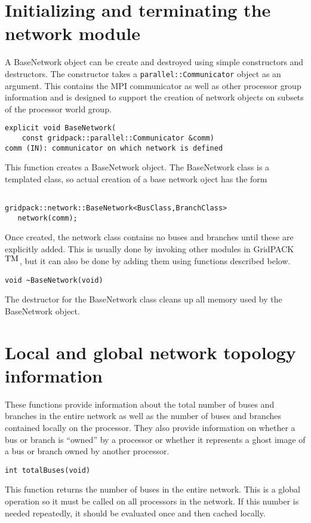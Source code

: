 \documentclass[12pt]{article}
\begin{document}
\section{Initializing and terminating the network module}
A BaseNetwork object can be create and destroyed using simple constructors and
destructors. The constructor takes a \texttt{parallel::Communicator} object as
an argument. This contains the MPI communicator as well as other processor group
information and is designed to support the creation of network objects on subsets
of the processor world group.
\color{blue}
\begin{verbatim}
explicit void BaseNetwork(
    const gridpack::parallel::Communicator &comm)
comm (IN): communicator on which network is defined
\end{verbatim}
\normalcolor
This function creates a BaseNetwork object. The BaseNetwork class is a templated
class, so actual creation of a base network oject has the form
\begin{verbatim}

gridpack::network::BaseNetwork<BusClass,BranchClass>
   network(comm);

\end{verbatim}
Once created, the network class contains no buses and branches until these are
explicitly added. This is usually done by invoking other modules in
GridPACK$^{\mbox{TM}}$, but it can also be done by adding them using functions described
below.

\color{blue}
\begin{verbatim}
void ~BaseNetwork(void)
\end{verbatim}
\normalcolor
The destructor for the BaseNetwork class cleans up all memory used by the
BaseNetwork object.

\section{Local and global network topology information}
These functions provide information about the total number of buses and branches
in the entire network as well as the number of buses and branches contained
locally on the processor. They also provide information on whether a bus or
branch is ``owned'' by a processor or whether it represents a ghost image of a
bus or branch owned by another processor.

\color{blue}
\begin{verbatim}
int totalBuses(void)
\end{verbatim}
\normalcolor
This function returns the number of buses in the entire network. This is a
global operation so it must be called on all processors in the network. If this
number is needed repeatedly, it should be evaluated once and then cached
locally.
\end{document}
